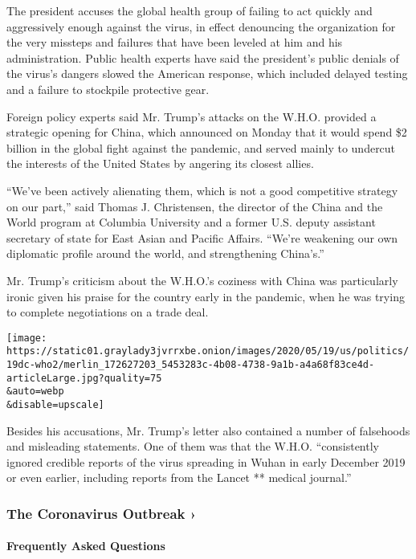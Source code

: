 The president accuses the global health group of failing to act quickly
and aggressively enough against the virus, in effect denouncing the
organization for the very missteps and failures that have been leveled
at him and his administration. Public health experts have said the
president's public denials of the virus's dangers slowed the American
response, which included delayed testing and a failure to stockpile
protective gear.

Foreign policy experts said Mr. Trump's attacks on the W.H.O. provided a
strategic opening for China, which announced on Monday that it would
spend \$2 billion in the global fight against the pandemic, and served
mainly to undercut the interests of the United States by angering its
closest allies.

``We've been actively alienating them, which is not a good competitive
strategy on our part,'' said Thomas J. Christensen, the director of the
China and the World program at Columbia University and a former U.S.
deputy assistant secretary of state for East Asian and Pacific Affairs.
``We're weakening our own diplomatic profile around the world, and
strengthening China's.''

Mr. Trump's criticism about the W.H.O.'s coziness with China was
particularly ironic given his praise for the country early in the
pandemic, when he was trying to complete negotiations on a trade deal.

\texttt{[image: https://static01.graylady3jvrrxbe.onion/images/2020/05/19/us/politics/19dc-who2/merlin\_172627203\_5453283c-4b08-4738-9a1b-a4a68f83ce4d-articleLarge.jpg?quality=75\\\&auto=webp\\\&disable=upscale]}

Besides his accusations, Mr. Trump's letter also contained a number of
falsehoods and misleading statements. One of them was that the W.H.O.
``consistently ignored credible reports of the virus spreading in Wuhan
in early December 2019 or even earlier, including reports from the
Lancet ** medical journal.''

\href{https://www.nytimes3xbfgragh.onion/news-event/coronavirus?action=click\&pgtype=Article\&state=default\&region=MAIN_CONTENT_3\&context=storylines_faq}{}

\hypertarget{the-coronavirus-outbreak-}{%
\subsubsection{The Coronavirus Outbreak
›}\label{the-coronavirus-outbreak-}}

\hypertarget{frequently-asked-questions}{%
\paragraph{Frequently Asked
Questions}\label{frequently-asked-questions}}

